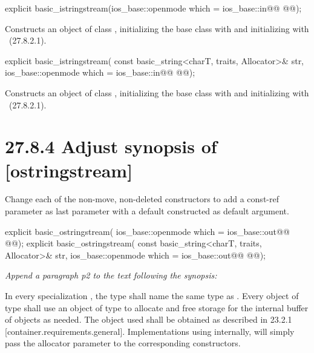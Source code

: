 \documentclass[ebook,11pt,article]{memoir}
\begin{document}
\begin{itemdecl}
explicit basic_istringstream(ios_base::openmode which = ios_base::in@\ins{,}@
  @@);
\end{itemdecl}
\begin{itemdescr}
\pnum
\effects
Constructs an object of class
,
initializing the base class with
and initializing  with
~({27.8.2.1}).
\end{itemdescr}

\begin{itemdecl}
explicit basic_istringstream(
  const basic_string<charT, traits, Allocator>& str,
  ios_base::openmode which = ios_base::in@\ins{,}@
  @@);
\end{itemdecl}

\begin{itemdescr}
\pnum
\effects
Constructs an object of class
,
initializing the base class with
and initializing  with
~({27.8.2.1}).
\end{itemdescr}



\section{27.8.4 Adjust synopsis of  [ostringstream]}
Change each of the non-move, non-deleted constructors to add a const-ref  parameter as last parameter with a default constructed  as default argument. 
\begin{codeblock}
explicit basic_ostringstream(
             ios_base::openmode which = ios_base::out@\ins{,}@
             @@);
explicit basic_ostringstream(
             const basic_string<charT, traits, Allocator>& str,
             ios_base::openmode which = ios_base::out@\ins{,}@
             @@);
\end{codeblock}

\textit{Append a paragraph p2 to the text following the synopsis:}

\begin{insrt}
\pnum
In every specialization , the type  shall name the same type as . Every object of type  shall use an object of type  to allocate and free storage for the internal buffer of  objects as needed. The  object used shall be obtained as described in 23.2.1 [container.requirements.general].
\enternote
Implementations using  internally, will simply pass the allocator parameter to the corresponding  constructors.
\exitnote
\end{insrt}
\end{document}

